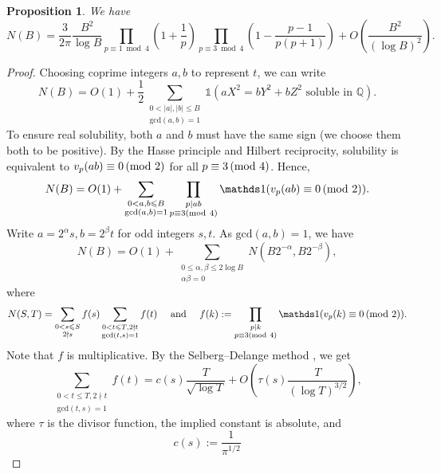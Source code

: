 \documentclass[a4paper,12pt,reqno]{amsart}
\numberwithin{equation}{section} \numberwithin{figure}{section}
\newcommand\Q{\mathbb{Q}}
\newcommand{\md}[1]{  \left(\textnormal{mod}\ #1\right)}
\renewcommand{\l}{\left}
\renewcommand{\r}{\right}
\renewcommand{\gcd}{\textrm{gcd}}
\renewcommand{\leq}{\leqslant}
\renewcommand{\#}{\sharp}
\newtheorem{proposition}[lemma]{Proposition}
\theoremstyle{definition}
\numberwithin{lemma}{section}
\begin{document}
\begin{proposition} \label{prop:easy}
	We have
	\[N(B)
	=
 	 \frac{3}{2\pi} \frac{B^2}{\log B}
	\prod_{p \equiv 1 \bmod 4} \left(1 + \frac{1}{p} \right)
	\prod_{p \equiv 3 \bmod 4} \left( 1 - \frac{p-1}{p(p+1)}\right)
 	+
	O\left( \frac{B^2}{(\log B)^2} \right)
	.
	\]
\end{proposition}
\begin{proof}
Choosing coprime  integers $a,b$ to represent $t$, we can write 
 \[N(B)=O(1)+ \frac{1}{2} \sum_{\substack{0< \vert a\vert ,\vert b \vert \leq B \\ \gcd(a,b)=1  }} \mathds 1(aX^2=bY^2+bZ^2 \textrm { soluble in } \Q).\] 
To ensure real solubility, both $a$ and $b$ must have the same sign (we choose them both to be positive).
By the Hasse principle and Hilbert reciprocity, solubility is equivalent to $v_p(ab) \equiv 0 \md{2}$ for all $p\equiv 3 \md{4}$.  %
 Hence,  \[N(B)=O(1)+ \sum_{\substack{0<a,b \leq B \\ \gcd(a,b)=1  
\\
 }}  \prod_{\substack{ p\mid ab   \\   p\equiv 3 \md{4}   }  }   \mathds 1(v_p(ab) \equiv 0 \md{2}  ).\]
Write $ a=2^\alpha s  , b=2^\beta t $ for odd integers $s,t $. As $\gcd(a,b) = 1$, we have
\[
N(B)=O(1)+ \sum_{\substack{ 0\leq \alpha, \beta \leq 2 \log B \\  \alpha \beta =0  }} N(B 2^{-\alpha}, B 2^{-\beta}),
\]
where
$$
N(S,T) =  \sum_{\substack{0<s \leq  S    \\ 2\nmid s   }}  f(s)   \sum_{\substack{ 0< t \leq T, 2\nmid t    \\   \gcd(t,s)=1   }}     f(t) \quad{}\text{ and } \quad{}  f( k ) := %
 \prod_{\substack{ p\mid k   \\   p\equiv 3 \md{4}    }  }   \mathds 1(v_p(k ) \equiv 0 \md{2}  ) .  $$
Note that $f$ is multiplicative.
By the Selberg--Delange method  \cite[Ch.~II.5, Thm.~5.2]{Ten95}, we   get     
\begin{equation}\label{eq:twosquaresfirst}
\sum_{\substack{ 0< t \leq T, 2 \nmid t   \\   \gcd(t,s)=1   }}     f(t) 
=c(s) \frac{T}{\sqrt{\log T} } +O\l(\tau(s) \frac{T}{(\log T)^{3/2}}\r),\end{equation}
where $\tau$ is the divisor function, the implied constant is absolute,  and
\[ c(s):= 
\frac{1}{\pi^{1/2}  }    
\]
\end{proof}
\end{document}
